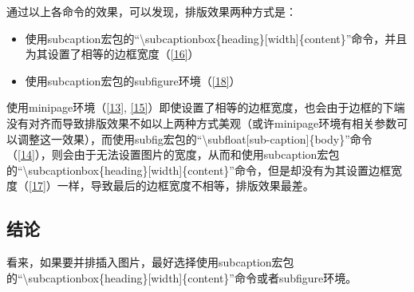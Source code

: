 \documentclass{article}
\begin{document}
    通过以上各命令的效果，可以发现，排版效果两种方式是：

    \begin{itemize}
        \item 使用subcaption宏包的``\textbackslash subcaptionbox\{heading\}[width]\{content\}''命令，并且为其设置了相等的边框宽度（\ref{16}）
        \item 使用subcaption宏包的subfigure环境（\ref{18}）
    \end{itemize}
    
    使用minipage环境（\ref{13}, \ref{15}）即使设置了相等的边框宽度，也会由于边框的下端没有对齐而导致排版效果不如以上两种方式美观（或许minipage环境有相关参数可以调整这一效果），而使用subfig宏包的``\textbackslash subfloat[sub-caption]\{body\}''命令（\ref{14}），则会由于无法设置图片的宽度，从而和使用subcaption宏包的``\textbackslash subcaptionbox\{heading\}[width]\{content\}''命令，但是却没有为其设置边框宽度（\ref{17}）一样，导致最后的边框宽度不相等，排版效果最差。

\subsection{结论}
    看来，如果要并排插入图片，最好选择使用subcaption宏包的``\textbackslash subcaptionbox\{heading\}[width]\{content\}''命令或者subfigure环境。
    

\listoffigures
\end{document}
